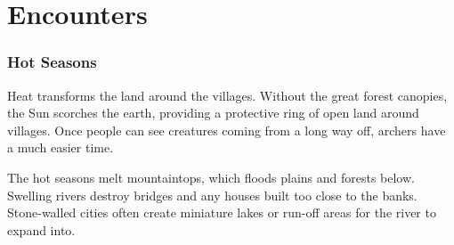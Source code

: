 \chapter[Encounters at the Crossroads]{Encounters}

\setcounter{enc}{0}
\setcounter{track}{0}


\newcommand\encBigList{
  \ifcase\value{enc}\relax
    \ifcase\value{track}\relax%
      Flood
    \or
      Bandits
    \or
      Hot Spell
    \or
      Flood
    \else
      Peace
    \fi
  \or
    \ifcase\value{track}\relax%
      Peace
    \or
      Traders
    \or
      Rain
    \or
      Peace
    \else
      Monster
    \fi
  \or
    \ifcase\value{track}\relax%
      Traders
    \or
      Broken Path
    \or
      Storm
    \or
      Peace
    \else
      Monster
    \fi
  \or
    \ifcase\value{track}\relax%
      Peace
    \or
      Bandits
    \or
      Peace
    \or
      Monster
    \else
      Peace
    \fi
  \else
    \ifcase\value{track}\relax%
      Peace
    \or
      Icy Roads
    \or
      Snowfall
    \or
      Peace
    \else
      Peace
    \fi
  \fi
}

\bigLine
\begin{multicols}{2}

\subsection{Hot Seasons}

\noindent
Heat transforms the land around the villages.
Without the great forest canopies, the Sun scorches the earth, providing a protective ring of open land around villages.
Once people can see creatures coming from a long way off, archers have a much easier time.

The hot seasons melt mountaintops, which floods plains and forests below.
Swelling rivers destroy bridges and any houses built too close to the banks.
Stone-walled cities often create miniature lakes or run-off areas for the river to expand into.

\end{multicols}

